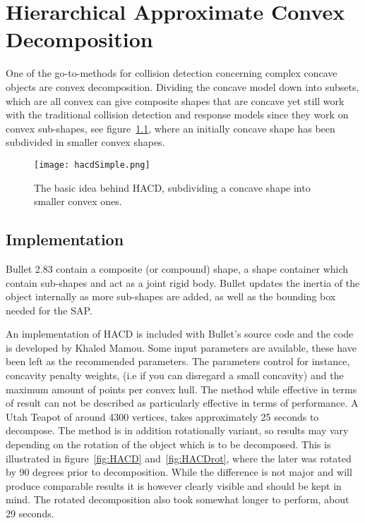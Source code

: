 \chapter{Hierarchical Approximate Convex Decomposition}\label{cha:meth2}
One of the go-to-methods for collision detection concerning complex concave objects
are convex decomposition. Dividing the concave model down into subsets, which are
all convex can give composite shapes that are concave yet still work with the
traditional collision detection and response models since they work on convex
sub-shapes, see figure~\ref{fig:hacdSimple}, where an initially concave shape has
been subdivided in smaller convex shapes.

\begin{figure}[H]
  \centering
  \texttt{[image: hacdSimple.png]}
  \caption{The basic idea behind HACD, subdividing a concave shape into smaller convex ones.}
  \label{fig:hacdSimple}
\end{figure}

\section{Implementation}
Bullet 2.83 contain a
composite (or compound) shape, a shape container which contain sub-shapes and act
as a joint rigid body. Bullet updates the inertia of the object internally as
more sub-shapes are added, as well as the bounding box needed for the SAP.

An implementation of HACD is included with Bullet's source code and the code is
developed by Khaled Mamou. Some input parameters are available, these have been
left as the recommended parameters. The parameters control for instance, concavity
penalty weights, (i.e if you can disregard a small concavity)
and the maximum amount of points per convex hull.
The method while effective in terms of result can not be described as
particularly effective in terms of performance. A Utah Teapot of around 4300 vertices,
takes approximately 25 seconds to decompose. The method is in addition rotationally
 variant, so results may vary depending on the rotation of the object which is to be decomposed.
This is illustrated in figure~\ref{fig:HACD} and~\ref{fig:HACDrot}, where the later
 was rotated by 90 degrees prior to decomposition. While the difference is not
 major and will produce comparable results it is however clearly visible and should be kept in mind.
 The rotated decomposition also took somewhat longer to perform, about 29 seconds.

